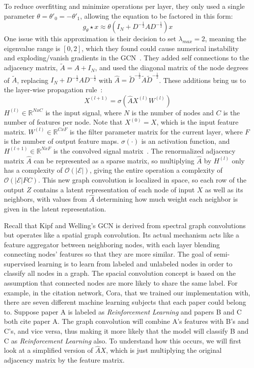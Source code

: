 To reduce overfitting and minimize operations per layer, they only used a single parameter $\theta = \theta'_0 = -\theta'_1$, allowing the equation to be factored in this form:
\begin{equation} 
\label{single_param}
g_\theta \star x \approx \theta(I_N + D^{-\frac{1}{2}}AD^{-\frac{1}{2}})x
\end{equation}
One issue with this approximation is their decision to set $\lambda_{max} = 2$, meaning the eigenvalue range is $[0,2]$, which they found could cause numerical instability and exploding/vanish gradients in the GCN~\cite{Kipf2016}. They added self connections to the adjacency matrix, $\tilde{A} = A + I_N$, and used the diagonal matrix of the node degrees of $\tilde{A}$, replacing $I_N + D^{-\frac{1}{2}}AD^{-\frac{1}{2}}$ with $\hat{A} = \tilde{D}^{-\frac{1}{2}}\tilde{A}\tilde{D}^{-\frac{1}{2}}$. These additions bring us to the layer-wise propagation rule~\cite{Kipf2016}:
\begin{equation}
\label{prop_rule}
X^{(l+1)} = \sigma(\hat{A}X^{(l)}W^{(l)})
\end{equation}
$H^{(l)} \in \mathbb{R}^{N x C}$ is the input signal, where $N$ is the number of nodes and $C$ is the number of features per node. Note that $X^{(0)} = X$, which is the input feature matrix. $W^{(l)} \in \mathbb{R}^{C x F}$ is the filter parameter matrix for the current layer, where $F$ is the number of output feature maps. $\sigma(\cdot)$ is an activation function, and $H^{(l+1)} \in \mathbb{R}^{N x F}$ is the convolved signal matrix~\cite{Kipf2016}. The renormalized adjacency matrix $\hat{A}$ can be represented as a sparse matrix, so multiplying $\hat{A}$ by $H^{(l)}$ only has a complexity of $\mathcal{O}(|\mathcal{E}|)$, giving the entire operation a complexity of $\mathcal{O}(|\mathcal{E}|FC)$.  This new graph convolution is localized in space, so each row of the output $Z$ contains a latent representation of each node of input $X$ as well as its neighbors, with values from $\hat{A}$ determining how much weight each neighbor is given in the latent representation.

Recall that Kipf and Welling's GCN is derived from spectral graph convolutions but operates like a spatial graph convolution. Its actual mechanism acts like a feature aggregator between neighboring nodes, with each layer blending connecting nodes' features so that they are more similar. The goal of semi-supervised learning is to learn from labeled and unlabeled nodes in order to classify all nodes in a graph. The spacial convolution concept is based on the assumption that connected nodes are more likely to share the same label. For example, in the citation network, Cora, that we trained our implementation with, there are seven different machine learning subjects that each paper could belong to. Suppose paper A is labeled as \textit{Reinforcement Learning} and papers B and C both cite paper A. The graph convolution will combine A's features with B's and C's, and vice versa, thus making it more likely that the model will classify B and C as \textit{Reinforcement Learning} also. 
To understand how this occurs, we will first look at a simplified version of $\hat{A}X$, which is just multiplying the original adjacency matrix by the feature matrix.  


